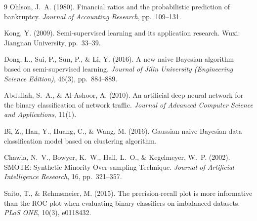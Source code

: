 \documentclass[11pt]{article}
\begin{document}
\begin{thebibliography}{9}
\small
{} Ohlson, J.~A. (1980). Financial ratios and the probabilistic
prediction of bankruptcy. \textit{Journal of Accounting Research}, pp.~109--131.

 Kong, Y. (2009). Semi-supervised learning and its application
research. Wuxi: Jiangnan University, pp.~33--39.

 Dong, L., Sui, P., Sun, P., \& Li, Y. (2016). A new naive
Bayesian algorithm based on semi-supervised learning. \textit{Journal of Jilin
University (Engineering Science Edition)}, 46(3), pp.~884--889.

 Abdullah, S.~A., \& Al-Ashoor, A. (2010). An artificial deep
neural network for the binary classification of network traffic.
\textit{Journal of Advanced Computer Science and Applications}, 11(1).

 Bi, Z., Han, Y., Huang, C., \& Wang, M. (2016). Gaussian naive
Bayesian data classification model based on clustering algorithm.

 Chawla, N.~V., Bowyer, K.~W., Hall, L.~O., \& Kegelmeyer,
W.~P. (2002). SMOTE: Synthetic Minority Over-sampling Technique.
\textit{Journal of Artificial Intelligence Research}, 16, pp.~321--357.

 Saito, T., \& Rehmsmeier, M. (2015). The precision-recall plot
is more informative than the ROC plot when evaluating binary classifiers on
imbalanced datasets. \textit{PLoS ONE}, 10(3), e0118432.
\end{thebibliography}
\end{document}
